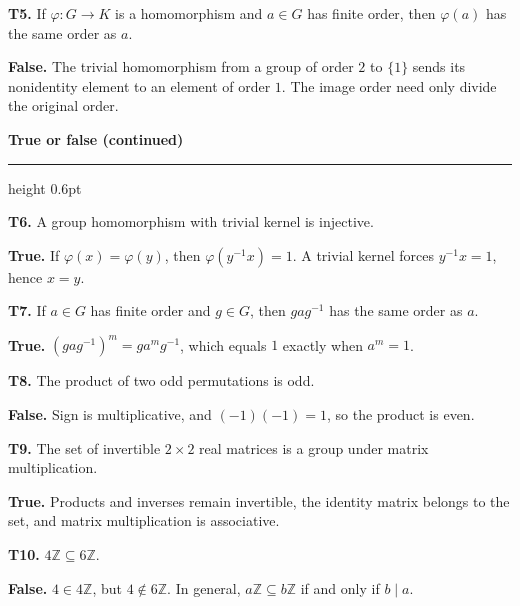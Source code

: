 \documentclass[11pt]{article}
\newcommand{\chapterheading}[1]{%
  \par\vspace{0.5em}
  {\color{courseblue}\Large\bfseries #1}\par\vspace{0.35em}
  {\color{boxborder}\hrule height 0.6pt}\vspace{0.35em}
}
\begin{document}
\textbf{T5.} If $\varphi:G\to K$ is a homomorphism and $a\in G$ has finite order, then $\varphi(a)$ has the same order as $a$.
\begin{solution}
\textbf{False.} The trivial homomorphism from a group of order $2$ to $\{1\}$ sends its nonidentity element to an element of order $1$. The image order need only divide the original order.
\end{solution}
\newpage
\chapterheading{True or false (continued)}
\textbf{T6.} A group homomorphism with trivial kernel is injective.
\begin{solution}
\textbf{True.} If $\varphi(x)=\varphi(y)$, then $\varphi(y^{-1}x)=1$. A trivial kernel forces $y^{-1}x=1$, hence $x=y$.
\end{solution}
\textbf{T7.} If $a\in G$ has finite order and $g\in G$, then $gag^{-1}$ has the same order as $a$.
\begin{solution}
\textbf{True.} $(gag^{-1})^m=ga^mg^{-1}$, which equals $1$ exactly when $a^m=1$.
\end{solution}
\textbf{T8.} The product of two odd permutations is odd.
\begin{solution}
\textbf{False.} Sign is multiplicative, and $(-1)(-1)=1$, so the product is even.
\end{solution}
\textbf{T9.} The set of invertible $2\times2$ real matrices is a group under matrix multiplication.
\begin{solution}
\textbf{True.} Products and inverses remain invertible, the identity matrix belongs to the set, and matrix multiplication is associative.
\end{solution}
\textbf{T10.} $4\mathbb Z\subseteq6\mathbb Z$.
\begin{solution}
\textbf{False.} $4\in4\mathbb Z$, but $4\notin6\mathbb Z$. In general, $a\mathbb Z\subseteq b\mathbb Z$ if and only if $b\mid a$.
\end{solution}
\end{document}

